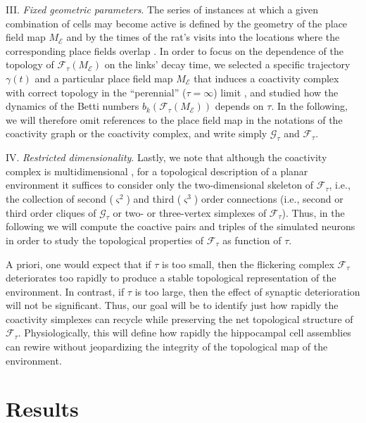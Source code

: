 \documentclass[12pt,tightenlines]{revtex4}
\begin{document}
III. \emph{Fixed geometric parameters}. The series of instances at which a given combination of cells may become active is 
defined by the geometry of the place field map $M_\mathcal{E}$ and by the times of the rat's visits into the locations where 
the corresponding place fields overlap \cite{McNaughton,Shapiro}. In order to focus on the dependence of the topology of 
$\mathcal{F}_{\tau}(M_\mathcal{E})$ on the links' decay time, we selected a specific trajectory $\gamma(t)$ and a particular 
place field map $M_\mathcal{E}$ that induces a coactivity complex with correct topology in the ``perennial'' ($\tau = \infty$) 
limit \cite{ Dabaghian,Arai}, and studied how the dynamics of the Betti numbers $b_k(\mathcal{F}_{\tau}(M_\mathcal{E}))$ 
depends on $\tau$. In the following, we will therefore omit references to the place field map in the notations of the coactivity 
graph or the coactivity complex, and write simply $\mathcal{G}_{\tau}$ and $\mathcal{F}_{\tau}$.

IV. \emph{Restricted dimensionality}. Lastly, we note that although the coactivity complex is multidimensional \cite{ Babichev1}, 
for a topological description of a planar environment it suffices to consider only the two-dimensional skeleton of $\mathcal{F}_{\tau}$, 
i.e., the collection of second ($\varsigma^2$) and third ($\varsigma^3$) order connections (i.e., second or third order cliques of 
$\mathcal{G}_{\tau}$ or two- or three-vertex simplexes of $\mathcal{F}_{\tau}$). Thus, in the following we will compute the 
coactive pairs and triples of the simulated neurons in order to study the topological properties of $\mathcal{F}_{\tau}$ as function 
of $\tau$. 

A priori, one would expect that if $\tau$ is too small, then the flickering complex $\mathcal{F}_{\tau}$ deteriorates too rapidly 
to produce a stable topological representation of the environment. In contrast, if $\tau$ is too large, then the effect of synaptic 
deterioration will not be significant. Thus, our goal will be to identify just how rapidly the coactivity simplexes can recycle while 
preserving the net topological structure of $\mathcal{F}_{\tau}$. Physiologically, this will define how rapidly the hippocampal 
cell assemblies can rewire without jeopardizing the integrity of the topological map of the environment.

\section{Results}
\label{section:results}
\end{document}
